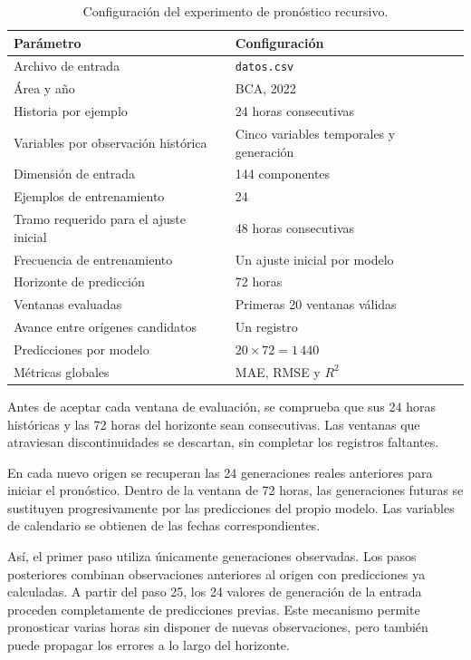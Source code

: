 \begin{table}[htbp]
    \centering
    \caption{Configuración del experimento de pronóstico recursivo.}
    \label{tab:configuracion-recursiva}
    \begin{tabular}{p{}p{}}
        \toprule
        Parámetro & Configuración \\
        \midrule
        Archivo de entrada & \texttt{datos.csv} \\
        Área y año & BCA, 2022 \\
        Historia por ejemplo & 24 horas consecutivas \\
        Variables por observación histórica & Cinco variables temporales y generación \\
        Dimensión de entrada & 144 componentes \\
        Ejemplos de entrenamiento & 24 \\
        Tramo requerido para el ajuste inicial & 48 horas consecutivas \\
        Frecuencia de entrenamiento & Un ajuste inicial por modelo \\
        Horizonte de predicción & 72 horas \\
        Ventanas evaluadas & Primeras 20 ventanas válidas \\
        Avance entre orígenes candidatos & Un registro \\
        Predicciones por modelo & $20\times72=1\,440$ \\
        Métricas globales & MAE, RMSE y $R^2$ \\
        \bottomrule
    \end{tabular}
\end{table}

Antes de aceptar cada ventana de evaluación, se comprueba que sus 24 horas históricas y las 72 horas del horizonte sean consecutivas. Las ventanas que atraviesan discontinuidades se descartan, sin completar los registros faltantes.

En cada nuevo origen se recuperan las 24 generaciones reales anteriores para iniciar el pronóstico. Dentro de la ventana de 72 horas, las generaciones futuras se sustituyen progresivamente por las predicciones del propio modelo. Las variables de calendario se obtienen de las fechas correspondientes.

Así, el primer paso utiliza únicamente generaciones observadas. Los pasos posteriores combinan observaciones anteriores al origen con predicciones ya calculadas. A partir del paso 25, los 24 valores de generación de la entrada proceden completamente de predicciones previas. Este mecanismo permite pronosticar varias horas sin disponer de nuevas observaciones, pero también puede propagar los errores a lo largo del horizonte.

